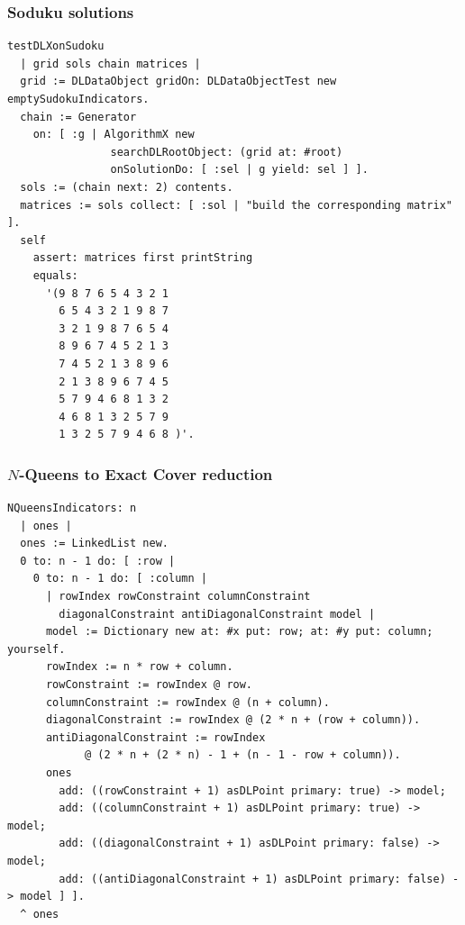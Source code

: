 \documentclass[10pt]{beamer}
\begin{document}
\begin{frame}[fragile]
\frametitle{Soduku solutions}
\begin{verbatim}
testDLXonSudoku
  | grid sols chain matrices |
  grid := DLDataObject gridOn: DLDataObjectTest new emptySudokuIndicators.
  chain := Generator
    on: [ :g | AlgorithmX new
                searchDLRootObject: (grid at: #root)
                onSolutionDo: [ :sel | g yield: sel ] ].
  sols := (chain next: 2) contents.
  matrices := sols collect: [ :sol | "build the corresponding matrix" ].
  self
    assert: matrices first printString
    equals:
      '(9 8 7 6 5 4 3 2 1
        6 5 4 3 2 1 9 8 7
        3 2 1 9 8 7 6 5 4
        8 9 6 7 4 5 2 1 3
        7 4 5 2 1 3 8 9 6
        2 1 3 8 9 6 7 4 5
        5 7 9 4 6 8 1 3 2
        4 6 8 1 3 2 5 7 9
        1 3 2 5 7 9 4 6 8 )'.
\end{verbatim}
\end{frame}

\begin{frame}[fragile]
\frametitle{$N$-Queens to Exact Cover reduction}
\begin{verbatim}
NQueensIndicators: n
  | ones |
  ones := LinkedList new.
  0 to: n - 1 do: [ :row | 
    0 to: n - 1 do: [ :column | 
      | rowIndex rowConstraint columnConstraint 
        diagonalConstraint antiDiagonalConstraint model |
      model := Dictionary new at: #x put: row; at: #y put: column; yourself.
      rowIndex := n * row + column.
      rowConstraint := rowIndex @ row.
      columnConstraint := rowIndex @ (n + column).
      diagonalConstraint := rowIndex @ (2 * n + (row + column)).
      antiDiagonalConstraint := rowIndex
            @ (2 * n + (2 * n) - 1 + (n - 1 - row + column)).
      ones
        add: ((rowConstraint + 1) asDLPoint primary: true) -> model;
        add: ((columnConstraint + 1) asDLPoint primary: true) -> model;
        add: ((diagonalConstraint + 1) asDLPoint primary: false) -> model;
        add: ((antiDiagonalConstraint + 1) asDLPoint primary: false) -> model ] ].
  ^ ones
\end{verbatim}
\end{frame}
\end{document}
